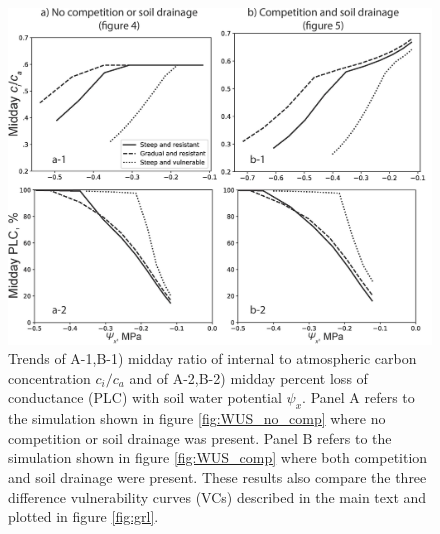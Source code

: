 \documentclass[utf8]{frontiersSCNS} %
\begin{document}
\begin{figure}[h]
    \begin{center}
         \includegraphics[scale=0.75]{PLC_cica.jpg}   
    \end{center}
    \caption{Trends of A-1,B-1) midday ratio of internal to atmospheric carbon concentration $c_i / c_a$ and of A-2,B-2) midday percent loss of conductance (PLC) with soil water potential $\psi_x$. Panel A refers to the simulation shown in figure \ref{fig:WUS_no_comp} where no competition or soil drainage was present. Panel B refers to the simulation shown in figure \ref{fig:WUS_comp} where both competition and soil drainage were present. These results also compare the three difference vulnerability curves (VCs) described in the main text and plotted in figure \ref{fig:grl}.} 
    \label{fig:PLC_cica}
\end{figure}
\end{document}
